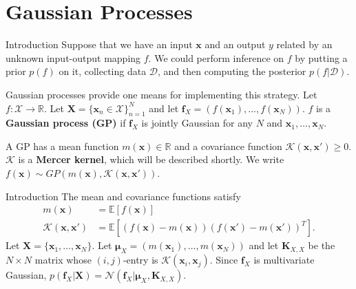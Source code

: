 \documentclass{beamer}
\begin{document}
\section{Gaussian Processes}

\begin{frame}{Introduction}
    Suppose that we have an input $\boldsymbol{x}$ and an  output $y$ related by an unknown input-output mapping $f$. We could perform inference on $f$ by putting a prior $p(f)$ on it, collecting data $\mathcal{D}$, and then computing the posterior $p(f | \mathcal{D})$.
    
    \medskip
    
    Gaussian processes provide one means for implementing this strategy. Let $f : \mathcal{X} \to \mathbb{R}$. Let $\boldsymbol{X} = \{\boldsymbol{x}_n \in \mathcal{X}\}_{n = 1}^N$ and let $\boldsymbol{f}_X = (f(\boldsymbol{x}_1), \ldots, f(\boldsymbol{x}_N))$. $f$ is a \textbf{Gaussian process (GP)} if $\boldsymbol{f}_X$ is jointly Gaussian for any $N$ and $\boldsymbol{x}_1, \ldots, \boldsymbol{x}_N$.
    
    \medskip
    
    A GP has a mean function $m(\boldsymbol{x}) \in \mathbb{R}$ and a covariance function $\mathcal{K}(\boldsymbol{x}, \boldsymbol{x}') \ge 0$. $\mathcal{K}$ is a \textbf{Mercer kernel}, which will be described shortly. We write $f(\boldsymbol{x}) \sim GP(m(\boldsymbol{x}), \mathcal{K}(\boldsymbol{x}, \boldsymbol{x}'))$.
\end{frame}

\begin{frame}{Introduction}
    The mean and covariance functions satisfy
    \begin{align*}
        m(\boldsymbol{x}) &= \mathbb{E}[f(\boldsymbol{x})] \\
        \mathcal{K}(\boldsymbol{x}, \boldsymbol{x}') &= \mathbb{E}[(f(\boldsymbol{x}) - m(\boldsymbol{x}))(f(\boldsymbol{x}') - m(\boldsymbol{x}'))^T].
    \end{align*}
    Let $\boldsymbol{X} = \{\boldsymbol{x}_1, \ldots, \boldsymbol{x}_N\}$. Let $\boldsymbol{\mu}_X = (m(\boldsymbol{x}_1), \ldots, m(\boldsymbol{x}_N))$ and let $\boldsymbol{K}_{X, X}$ be the $N \times N$ matrix whose $(i, j)$-entry is $\mathcal{K}(\boldsymbol{x}_i, \boldsymbol{x}_j)$. Since $\boldsymbol{f}_X$ is multivariate Gaussian, $p(\boldsymbol{f}_X | \boldsymbol{X}) = \mathcal{N}(\boldsymbol{f}_X | \boldsymbol{\mu}_X, \boldsymbol{K}_{X, X})$.
\end{frame}
\end{document}
